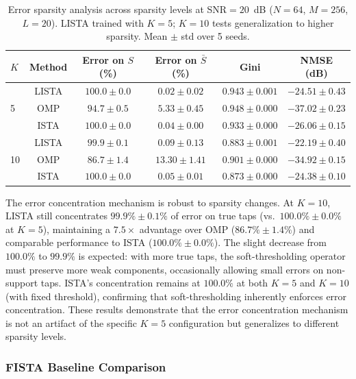 \documentclass[a4paper,fleqn]{cas-sc}
\begin{document}
\begin{table}[width=.9\linewidth,cols=6,pos=!htbp]
\caption{Error sparsity analysis across sparsity levels at SNR$=20$~dB ($N=64$, $M=256$, $L=20$). LISTA trained with $K=5$; $K=10$ tests generalization to higher sparsity. Mean $\pm$ std over 5 seeds.}\label{tab:error_sparsity_extended}
\begin{tabular*}{\tblwidth}{@{} LCCCCC@{}}
\toprule
$K$ & Method & Error on $S$ (\%) & Error on $\bar{S}$ (\%) & Gini & NMSE (dB) \\
\midrule
{}
  & LISTA & $\bm{100.0} \pm 0.0$ & $\bm{0.02} \pm 0.02$ & $0.943 \pm 0.001$ & $-24.51 \pm 0.43$ \\
  & OMP   & $94.7 \pm 0.5$ & $5.33 \pm 0.45$ & $0.948 \pm 0.000$ & $-37.02 \pm 0.23$ \\
  & ISTA  & $100.0 \pm 0.0$ & $0.04 \pm 0.00$ & $0.933 \pm 0.000$ & $-26.06 \pm 0.15$ \\
\midrule
{}
  & LISTA & $\bm{99.9} \pm 0.1$ & $\bm{0.09} \pm 0.13$ & $0.883 \pm 0.001$ & $-22.19 \pm 0.40$ \\
  & OMP   & $86.7 \pm 1.4$ & $13.30 \pm 1.41$ & $0.901 \pm 0.000$ & $-34.92 \pm 0.15$ \\
  & ISTA  & $100.0 \pm 0.0$ & $0.05 \pm 0.01$ & $0.873 \pm 0.000$ & $-24.38 \pm 0.10$ \\
\bottomrule
\end{tabular*}
\end{table}

The error concentration mechanism is robust to sparsity changes. At $K=10$, LISTA still concentrates $99.9\% \pm 0.1\%$ of error on true taps (vs.~$100.0\% \pm 0.0\%$ at $K=5$), maintaining a $7.5\times$ advantage over OMP ($86.7\% \pm 1.4\%$) and comparable performance to ISTA ($100.0\% \pm 0.0\%$). The slight decrease from $100.0\%$ to $99.9\%$ is expected: with more true taps, the soft-thresholding operator must preserve more weak components, occasionally allowing small errors on non-support taps. ISTA's concentration remains at $100.0\%$ at both $K=5$ and $K=10$ (with fixed threshold), confirming that soft-thresholding inherently enforces error concentration. These results demonstrate that the error concentration mechanism is not an artifact of the specific $K=5$ configuration but generalizes to different sparsity levels.

\subsubsection{FISTA Baseline Comparison}\label{sec:exp_fista}
\end{document}
